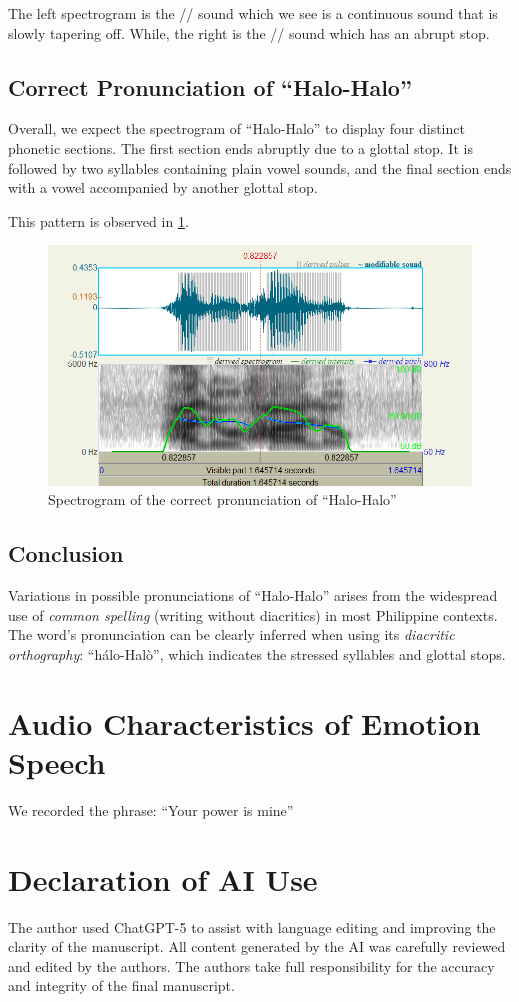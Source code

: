 \documentclass{article}
\begin{document}
The left spectrogram is the // sound which we see is a continuous
sound that is slowly tapering off. While, the right is the // sound
which has an abrupt stop.

\subsection{Correct Pronunciation of ``Halo-Halo''}
Overall, we expect the spectrogram of ``Halo-Halo'' to display four distinct
phonetic sections. The first section ends abruptly due to a glottal stop. It is
followed by two syllables containing plain vowel sounds, and the final section
ends with a vowel accompanied by another glottal stop.

This pattern is observed in \cref{fig:correct}.

\begin{figure}
    \centering
    \includegraphics[width=0.65\linewidth]{img/correct.png}
    \caption{Spectrogram of the correct pronunciation of ``Halo-Halo''}\label{fig:correct}
\end{figure}

\subsection{Conclusion}

Variations in possible pronunciations of ``Halo-Halo'' arises from the
widespread use of \emph{common spelling} (writing without diacritics) in most
Philippine contexts. The word's pronunciation can be clearly inferred when
using its \emph{diacritic orthography}: ``h\'alo-Hal\`o'', which indicates the
stressed syllables and glottal stops.

\section{Audio Characteristics of Emotion Speech}

We recorded the phrase: ``Your power is mine''




\section*{Declaration of AI Use}
The author used ChatGPT-5 to assist with language editing and improving the clarity of the manuscript. All content
generated by the AI was carefully reviewed and edited by the authors. The authors take full responsibility for the
accuracy and integrity of the final manuscript.
\end{document}
